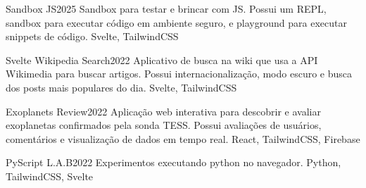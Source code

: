 %
%
%


\begin{projects}
	\project
	{Sandbox JS}{2025}
	{  }
	{Sandbox para testar e brincar com JS. Possui um REPL, sandbox para executar código em ambiente seguro, e playground para executar snippets de código.}
	{Svelte, TailwindCSS}

	\project
	{Svelte Wikipedia Search}{2022}
	{  }
	{Aplicativo de busca na wiki que usa a API Wikimedia para buscar artigos. Possui internacionalização, modo escuro e busca dos posts mais populares do dia.}
	{Svelte, TailwindCSS}
				
	\project
	{Exoplanets Review}{2022}
	{  }
	{Aplicação web interativa para descobrir e avaliar exoplanetas confirmados pela sonda TESS. Possui avaliações de usuários, comentários e visualização de dados em tempo real.}
	{React, TailwindCSS, Firebase}

    \project
	{PyScript L.A.B}{2022}
	{  }
	{Experimentos executando python no navegador.}
	{Python, TailwindCSS, Svelte}

\end{projects}